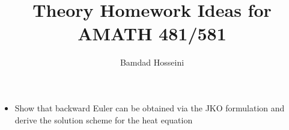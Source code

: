 \documentclass[11pt]{amsart}
\author{Bamdad Hosseini}
\title{Theory Homework Ideas for AMATH 481/581}
\begin{document}
\maketitle

\begin{itemize}
    \item Show that backward Euler can be obtained via the JKO formulation and
    derive the solution scheme for the heat equation

    
\end{itemize}
\end{document}
